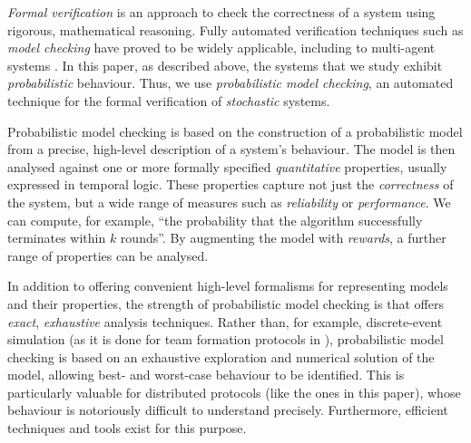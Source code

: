 \documentclass{llncs}
\newcommand{\dave}[1]{\marginpar{\footnotesize \color{red} {\bf D:} \textsf{#1}}}
\begin{document}
\emph{Formal verification} is an approach to check the correctness of a system
using rigorous, mathematical reasoning.
Fully automated verification techniques such as \emph{model checking}
have proved to be widely applicable,
including to multi-agent systems \cite{lomuscio2006mcmas}.
In this paper, as described above, the systems that we study exhibit \emph{probabilistic} behaviour.
Thus, we use \emph{probabilistic model checking}, an automated technique for
the formal verification of \emph{stochastic} systems.
%

Probabilistic model checking is based
on the construction of a probabilistic model from a precise,
high-level description of a system's behaviour.
The model is then analysed against one or more formally specified \emph{quantitative} properties,
usually expressed in temporal logic.
These properties capture not just the \emph{correctness} of the system,
but a wide range of measures such as \emph{reliability} or \emph{performance}.
We can compute, for example, ``the probability that the algorithm successfully terminates within $k$ rounds''.
By augmenting the model with \emph{rewards}, a further range of properties can be analysed.

In addition to offering convenient high-level formalisms for representing models and their properties,
the strength of probabilistic model checking is that offers \emph{exact}, \emph{exhaustive} analysis techniques.
Rather than, for example, discrete-event simulation
(as it is done for team formation protocols in \cite{gaston2005agent}),
probabilistic model checking is based on an exhaustive exploration and numerical solution of the model,
allowing best- and worst-case behaviour to be identified.
This is particularly valuable for distributed protocols (like the ones in this paper),
whose behaviour is notoriously difficult to understand precisely. %
Furthermore, efficient techniques and tools exist for this purpose.
\end{document}
